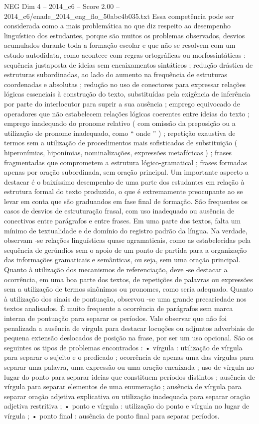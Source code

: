 \begin{textsample}{NEG Dim 4 – 2014\_c6 – Score 2.00 – 2014\_c6/enade\_2014\_eng\_flo\_50abc4b035.txt}
Essa competência pode ser considerada como a mais problemática no que diz respeito ao desempenho linguístico dos estudantes, porque são muitos os problemas observados, desvios acumulados durante toda a formação escolar e que não se resolvem com um estudo autodidata, como acontece com regras ortográficas ou morfossintáticas : sequência justaposta de ideias sem encaixamentos sintáticos ; redução drástica de estruturas subordinadas, ao lado do aumento na frequência de estruturas coordenadas e absolutas ; redução no uso de conectores para expressar relações lógicas essenciais à construção do texto, substituídas pela exigência de inferência por parte do interlocutor para suprir a sua ausência ; emprego equivocado de operadores que não estabelecem relações lógicas coerentes entre ideias do texto ; emprego inadequado do pronome relativo ( com omissão da preposição ou a utilização de pronome inadequado, como “ onde ” ) ; repetição exaustiva de termos sem a utilização de procedimentos mais sofisticados de substituição ( hiperonímias, hiponímias, nominalizações, expressões metafóricas ) ; frases fragmentadas que comprometem a estrutura lógico-gramatical ; frases formadas apenas por oração subordinada, sem oração principal.
Um importante aspecto a destacar é o baixíssimo desempenho de uma parte dos estudantes em relação à estrutura formal do texto produzido, o que é extremamente preocupante ao se levar em conta que são graduandos em fase final de formação.
São frequentes os casos de desvios de estruturação frasal, com uso inadequado ou ausência de conectivos entre parágrafos e entre frases.
Em uma parte dos textos, falta um mínimo de textualidade e de domínio do registro padrão da língua.
Na verdade, observam -se relações linguísticas quase agramaticais, como as estabelecidas pela sequência de gerúndios sem o apoio de um ponto de partida para a organização das informações gramaticais e semânticas, ou seja, sem uma oração principal.
Quanto à utilização dos mecanismos de referenciação, deve -se destacar a ocorrência, em uma boa parte dos textos, de repetições de palavras ou expressões sem a utilização de termos sinônimos ou pronomes, como seria adequado.
Quanto à utilização dos sinais de pontuação, observou -se uma grande precariedade nos textos analisados.
É muito frequente a ocorrência de parágrafos sem marca interna de pontuação para separar os períodos.
Vale observar que não foi penalizada a ausência de vírgula para destacar locuções ou adjuntos adverbiais de pequena extensão deslocados de posição na frase, por ser um uso opcional.
São os seguintes os tipos de problemas encontrados : • vírgula : utilização de vírgula para separar o sujeito e o predicado ; ocorrência de apenas uma das vírgulas para separar uma palavra, uma expressão ou uma oração encaixada ; uso de vírgula no lugar do ponto para separar ideias que constituem períodos distintos ; ausência de vírgula para separar elementos de uma enumeração ; ausência de vírgula para separar oração adjetiva explicativa ou utilização inadequada para separar oração adjetiva restritiva ; • ponto e vírgula : utilização do ponto e vírgula no lugar de vírgula ; • ponto final : ausência de ponto final para separar períodos.

\end{textsample}
